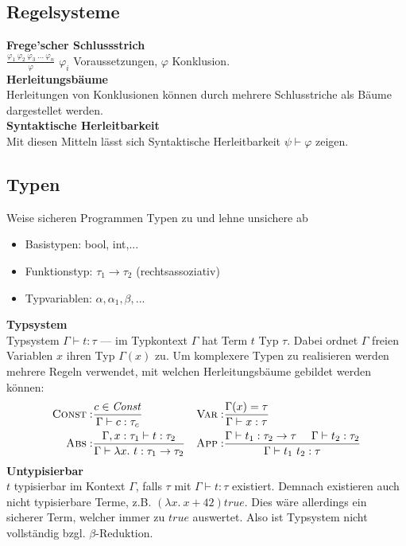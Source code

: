 \subsection{Regelsysteme}%
\label{tg:sub:regelsysteme}
\textbf{Frege'scher Schlussstrich}\\
\(\frac{\varphi_1\ \varphi_2\ \varphi_3\ \ldots\ \varphi_n}{\varphi}\) \(\varphi_i\) Voraussetzungen, \(\varphi\) Konklusion.\\
\textbf{Herleitungsbäume}\\
Herleitungen von Konklusionen können durch mehrere Schlusstriche als Bäume dargestellet werden.\\
\textbf{Syntaktische Herleitbarkeit}\\
Mit diesen Mitteln lässt sich Syntaktische Herleitbarkeit \(\psi \vdash \varphi\) zeigen.

\subsection{Typen}%
\label{tg:sub:typen}
Weise sicheren Programmen Typen zu und lehne unsichere ab
\begin{itemize}
  \item Basistypen: bool, int,...
  \item Funktionstyp: \(\tau_1 \rightarrow \tau_2\) (rechtsassoziativ)
  \item Typvariablen: \(\alpha, \alpha_1, \beta,...\)
\end{itemize}
\textbf{Typsystem}\\
Typsystem \(\Gamma \vdash t: \tau\) --- im Typkontext \(\Gamma\) hat Term \(t\) Typ \(\tau\). Dabei ordnet \(\Gamma\)
freien Variablen \(x\) ihren Typ \(\Gamma(x)\) zu.
Um komplexere Typen zu realisieren werden mehrere Regeln verwendet, mit welchen Herleitungsbäume gebildet werden können:\\
\begin{align*}
  \textsc{Const}:& \frac{c \in \mathit{Const}}{\Gamma \vdash c: \tau_c} &
  \textsc{Var}:&   \frac{\Gamma(x) = \tau}{\Gamma \vdash x: \tau}\\
  \textsc{Abs}:&   \frac{\Gamma, x: \tau_1 \vdash t: \tau_2}{\Gamma \vdash \lambda x.\ t: \tau_1 \rightarrow \tau_2} &
  \textsc{App}:&   \frac{\Gamma \vdash t_1: \tau_2 \rightarrow \tau \ \ \ \ \Gamma \vdash t_2: \tau_2}{\Gamma \vdash t_1\ t_2: \tau}                                                                                                                      
\end{align*}
\textbf{Untypisierbar}\\
\(t\) typisierbar im Kontext \(\Gamma\), falls \(\tau\) mit \(\Gamma \vdash t: \tau\) existiert.
Demnach existieren auch nicht typisierbare Terme, z.B. \((\lambda x.\ x + 42) \mathit{true}\).
Dies wäre allerdings ein sicherer Term, welcher immer zu \(\mathit{true}\) auswertet. Also ist Typsystem nicht vollständig
bzgl. \(\beta\)-Reduktion.


